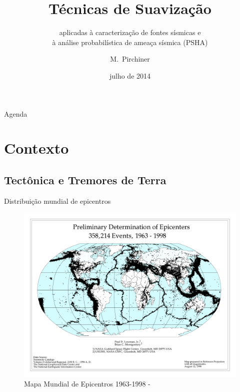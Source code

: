 \documentclass[ucs,8pt]{beamer}
\title[Smoothing Techniques] %
{Técnicas de Suavização}
\subtitle
{aplicadas à caracterização de fontes sísmicas e \\ 
 à análise probabilística de ameaça sísmica (PSHA)}
\author[Pirchiner, Marlon] %
{M.~Pirchiner }
\institute[EMAp-FGV / IAG-USP] %
{EMAp-FGV / Centro de Sismologia - USP}
\date[EMAP2014] %
{julho de 2014}
\begin{document}
\begin{frame}[plain]
  \titlepage
\end{frame}

\begin{frame}{Agenda}
  \tableofcontents
\end{frame}


\section{Contexto}
\subsection{Tectônica e Tremores de Terra}

\begin{frame}{Distribuição mundial de epicentros}
\begin{figure}[H]
   \centering
   \includegraphics[height=0.95\textheight]{global_pde_mag_all}
   \caption[Mapa Mundial de Epicentros 1963-1998]
   		   {Mapa Mundial de Epicentros 1963-1998 - \citet{lowman_jr_1998}} 
   \label{f:global_epicenters}
\end{figure} 
\end{frame}
\end{document}
